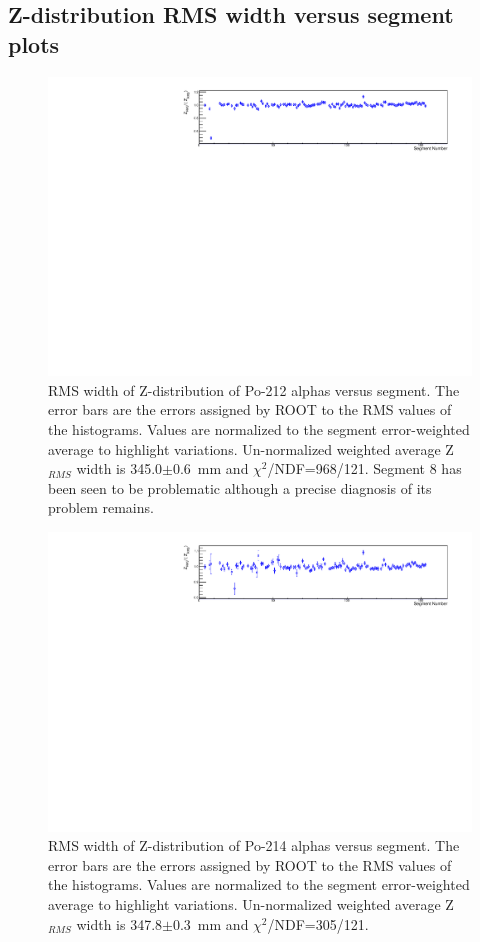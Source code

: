\subsection{Z-distribution RMS width versus segment plots}
\begin{figure}[!h]
\centering
\includegraphics[width=1.05\textwidth]{figures/PubBiPo212ZRMSvsCell.pdf}
\caption{\label{fig:ZRMSvsCell212}RMS width of Z-distribution of Po-212 alphas versus segment. The error bars are the errors assigned by ROOT to the RMS values of the histograms. Values are normalized to the segment error-weighted average to highlight variations. Un-normalized weighted average Z$_{RMS}$ width is 345.0$\pm$0.6~mm and $\chi^2$/NDF=968/121. Segment 8 has been seen to be problematic although a precise diagnosis of its problem remains.}
\end{figure}
\begin{figure}[!h]
\centering
\includegraphics[width=1.05\textwidth]{figures/PubBiPo214ZRMSvsCell.pdf}
\caption{\label{fig:ZRMSvsCell214}RMS width of Z-distribution of Po-214 alphas versus segment. The error bars are the errors assigned by ROOT to the RMS values of the histograms. Values are normalized to the segment error-weighted average to highlight variations. Un-normalized weighted average Z$_{RMS}$ width is 347.8$\pm$0.3~mm and $\chi^2$/NDF=305/121.}
\end{figure}
\clearpage
\newpage
